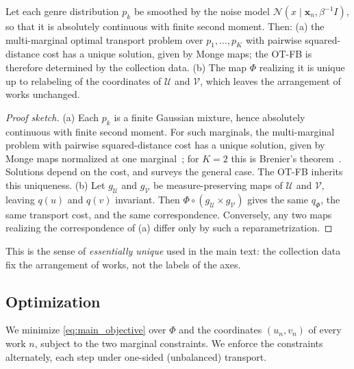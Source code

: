\begin{proposition}\label{prop:OT-FB}
    Let each genre distribution $p_k$ be smoothed by the noise model
    $\mathcal{N}(x \mid \mathbf{x}_n, \beta^{-1}I)$, so that it is
    absolutely continuous with finite second moment. Then:
    (a) the multi-marginal optimal transport problem over
    $p_1, \dots, p_K$ with pairwise squared-distance cost has a unique
    solution, given by Monge maps; the OT-FB is therefore determined by
    the collection data.
    (b) The map $\Phi$ realizing it is unique up to relabeling of the
    coordinates of $\mathcal{U}$ and $\mathcal{V}$, which leaves the
    arrangement of works unchanged.
\end{proposition}

\begin{proof}[Proof sketch]
    (a) Each $p_k$ is a finite Gaussian mixture, hence absolutely
    continuous with finite second moment. For such marginals, the
    multi-marginal problem with pairwise squared-distance cost has a
    unique solution, given by Monge maps normalized at one
    marginal~\citep{GangboSwiech199823}; for $K=2$ this is
    Brenier's theorem~\citeyearpar{Brenier1991375}. Solutions depend on the
    cost, and \citet{Pass20151771} surveys the general case. The OT-FB
    inherits this uniqueness.
    (b) Let $g_\mathcal{U}$ and $g_\mathcal{V}$ be measure-preserving
    maps of $\mathcal{U}$ and $\mathcal{V}$, leaving $q(u)$ and $q(v)$
    invariant. Then $\Phi \circ (g_\mathcal{U} \times g_\mathcal{V})$
    gives the same $q_\Phi$, the same transport cost, and the same
    correspondence. Conversely, any two maps realizing the
    correspondence of (a) differ only by such a reparametrization.
    \hfill\openbox
\end{proof}

This is the sense of \emph{essentially unique} used in the main text:
the collection data fix the arrangement of works, not the labels of
the axes.

\subsection{Optimization}

We minimize \eqref{eq:main_objective} over $\Phi$ and the coordinates
$(u_n, v_n)$ of every work $n$, subject to the two marginal
constraints. We enforce the constraints alternately, each step under
one-sided (unbalanced) transport.

